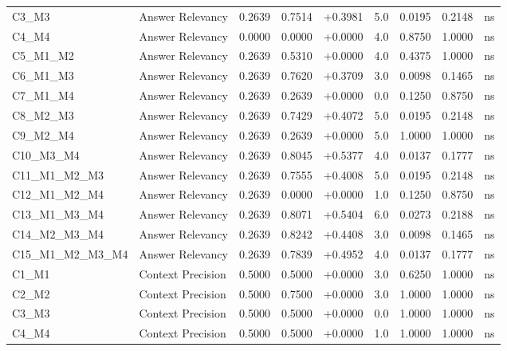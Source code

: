 \begin{table}[p]
\begin{tabular*}{\textwidth}{@{\extracolsep{\fill}} l l r r r r r r c @{}}
\addlinespace
C3\_M3          & Answer Relevancy     & 0.2639 & 0.7514 & +0.3981 & 5.0 & 0.0195 & 0.2148 & ns \\
\addlinespace
C4\_M4          & Answer Relevancy     & 0.0000 & 0.0000 & +0.0000 & 4.0 & 0.8750 & 1.0000 & ns \\
\addlinespace
C5\_M1\_M2      & Answer Relevancy     & 0.2639 & 0.5310 & +0.0000 & 4.0 & 0.4375 & 1.0000 & ns \\
\addlinespace
C6\_M1\_M3      & Answer Relevancy     & 0.2639 & 0.7620 & +0.3709 & 3.0 & 0.0098 & 0.1465 & ns \\
\addlinespace
C7\_M1\_M4      & Answer Relevancy     & 0.2639 & 0.2639 & +0.0000 & 0.0 & 0.1250 & 0.8750 & ns \\
\addlinespace
C8\_M2\_M3      & Answer Relevancy     & 0.2639 & 0.7429 & +0.4072 & 5.0 & 0.0195 & 0.2148 & ns \\
\addlinespace
C9\_M2\_M4      & Answer Relevancy     & 0.2639 & 0.2639 & +0.0000 & 5.0 & 1.0000 & 1.0000 & ns \\
\addlinespace
C10\_M3\_M4     & Answer Relevancy     & 0.2639 & 0.8045 & +0.5377 & 4.0 & 0.0137 & 0.1777 & ns \\
\addlinespace
C11\_M1\_M2\_M3 & Answer Relevancy     & 0.2639 & 0.7555 & +0.4008 & 5.0 & 0.0195 & 0.2148 & ns \\
\addlinespace
C12\_M1\_M2\_M4 & Answer Relevancy     & 0.2639 & 0.0000 & +0.0000 & 1.0 & 0.1250 & 0.8750 & ns \\
\addlinespace
C13\_M1\_M3\_M4 & Answer Relevancy     & 0.2639 & 0.8071 & +0.5404 & 6.0 & 0.0273 & 0.2188 & ns \\
\addlinespace
C14\_M2\_M3\_M4 & Answer Relevancy     & 0.2639 & 0.8242 & +0.4408 & 3.0 & 0.0098 & 0.1465 & ns \\
\addlinespace
C15\_M1\_M2\_M3\_M4 & Answer Relevancy     & 0.2639 & 0.7839 & +0.4952 & 4.0 & 0.0137 & 0.1777 & ns \\
\addlinespace
C1\_M1          & Context Precision    & 0.5000 & 0.5000 & +0.0000 & 3.0 & 0.6250 & 1.0000 & ns \\
\addlinespace
C2\_M2          & Context Precision    & 0.5000 & 0.7500 & +0.0000 & 3.0 & 1.0000 & 1.0000 & ns \\
\addlinespace
C3\_M3          & Context Precision    & 0.5000 & 0.5000 & +0.0000 & 0.0 & 1.0000 & 1.0000 & ns \\
\addlinespace
C4\_M4          & Context Precision    & 0.5000 & 0.5000 & +0.0000 & 1.0 & 1.0000 & 1.0000 & ns \\

\end{tabular*}
\end{table}
